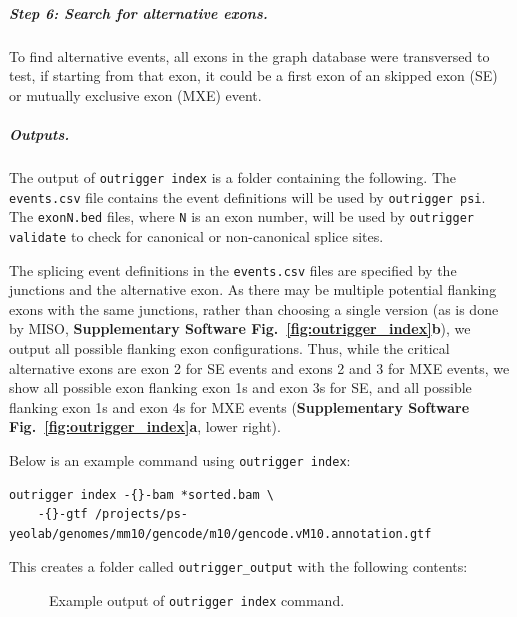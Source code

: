 \subparagraph{Step 6: Search for alternative exons.} To find alternative events, all exons in the graph database were transversed to test, if starting from that exon, it could be a first exon of an skipped exon (SE) or mutually exclusive exon (MXE) event. 

\subparagraph{Outputs.} The output of \texttt{outrigger index} is a folder containing the following. The \texttt{events.csv} file contains the event definitions will be used by \texttt{outrigger psi}. The \texttt{exonN.bed} files, where \texttt{N} is an exon number, will be used by \texttt{outrigger validate} to check for canonical or non-canonical splice sites.

The splicing event definitions in the \texttt{events.csv} files are specified by the junctions and the alternative exon. As there may be multiple potential flanking exons with the same junctions, rather than choosing a single version (as is done by MISO, \textbf{Supplementary Software Fig.~\ref{fig:outrigger_index}b}), we output all possible flanking exon configurations. Thus, while the critical alternative exons are exon 2 for SE events and exons 2 and 3 for MXE events, we show all possible exon flanking exon 1s and exon 3s for SE, and all possible flanking exon 1s and exon 4s for MXE events (\textbf{Supplementary Software Fig.~\ref{fig:outrigger_index}a}, lower right).

Below is an example command using \texttt{outrigger index}:

\begin{verbatim}
outrigger index -{}-bam *sorted.bam \
    -{}-gtf /projects/ps-yeolab/genomes/mm10/gencode/m10/gencode.vM10.annotation.gtf
\end{verbatim}

This creates a folder called \texttt{outrigger\_output} with the following contents:


\begin{figure}
\caption{Example output of \texttt{outrigger index} command.}
\end{figure}

